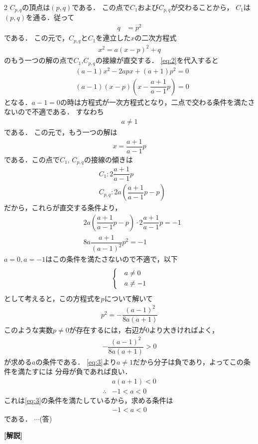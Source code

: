 \documentclass[../../main.tex]{subfiles}
\begin{document}
\begin{multicols}{2}
  $C_{p,q}$の頂点は$(p,q)$である．
  この点で$C_1$および$C_{p,q}$が交わることから，
  $C_1$は$(p,q)$を通る．従って
  \begin{align}
    q & = p^2\label{eq:2}
  \end{align}
  である．
  この元で，$C_{p,q}$と$C_{1}$を連立した$x$の二次方程式
  \begin{align}
    x^2 = a(x-p)^2+q
  \end{align}
  のもう一つの解の点で$C_1$,$C_{p,q}$の接線が直交する．
  \cref{eq:2}を代入すると
  \begin{align}
    & (a-1)x^2-2apx+(a+1)p^2 = 0                               \\
    & (a-1)\left(x-p\right)\left(x-\dfrac{a+1}{a-1}p\right) = 0
  \end{align}
  となる．$a-1=0$の時は方程式が一次方程式となり，二点で交わる条件を満たさないので不適である．
  すなわち
  \begin{align}
    a \neq 1 \label{eq:3}
  \end{align}
  である．
  この元で，もう一つの解は
  \begin{align}
    x = \dfrac{a+1}{a-1}p
  \end{align}
  である．この点で$C_1$, $C_{p,q}$の接線の傾きは
  \begin{align}
    & C_1: 2\dfrac{a+1}{a-1}p                     \\
    & C_{p,q}: 2a\left(\dfrac{a+1}{a-1}p-p\right)
  \end{align}
  だから，これらが直交する条件より，
  \begin{align}
    & 2a\left(\dfrac{a+1}{a-1}p-p\right) \cdot 2\dfrac{a+1}{a-1}p = -1 \\
    & 8a \dfrac{a+1}{(a-1)^2} p^2 = -1
  \end{align}
  $a=0, a=-1$はこの条件を満たさないので不適で，以下
  \begin{align}
    \begin{dcases}
      & a \neq 0  \\
      & a \neq -1
    \end{dcases}\label{eq:4}
  \end{align}
  として考えると，この方程式を$p$について解いて
  \begin{align}
    p^2 = -\dfrac{(a-1)^2}{8a(a+1)}
  \end{align}
  このような実数$p\neq 0$が存在するには，右辺が$0$より大きければよく，
  \begin{align}
    -\dfrac{(a-1)^2}{8a(a+1)} > 0
  \end{align}
  が求める$a$の条件である．
  \cref{eq:3}より$a\neq 1$だから分子は負であり，よってこの条件を満たすには
  分母が負であれば良い．
  \begin{align}
    & a(a+1) < 0 \\
    \therefore
    & -1 < a < 0
  \end{align}
  これは\cref{eq:3}の条件を満たしているから，求める条件は
  \begin{align}
    -1 < a < 0
  \end{align}
  である． $\cdots$(答)

  {\bf [解説]}

  \newpage
\end{multicols}
\end{document}
